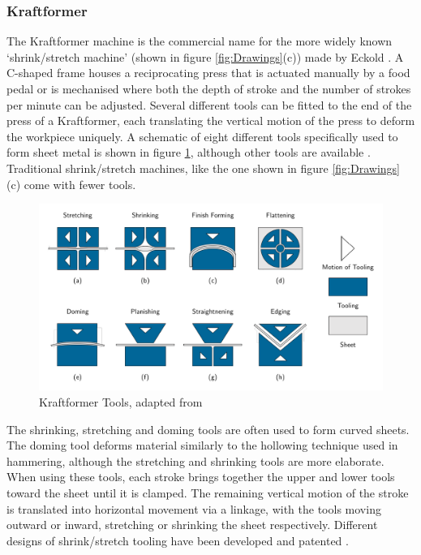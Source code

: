 \subsubsection{Kraftformer} \label{sec:ManualKraftformer}

The Kraftformer machine is the commercial name for the more widely known `shrink/stretch machine' (shown in figure \ref{fig:Drawings}(c)) made by Eckold \citep{Unknown2020ECKOLDBrochure}. A C-shaped frame houses a reciprocating press that is actuated manually by a food pedal or is mechanised where both the depth of stroke and the number of strokes per minute can be adjusted. Several different tools can be fitted to the end of the press of a Kraftformer, each translating the vertical motion of the press to deform the workpiece uniquely. A schematic of eight different tools specifically used to form sheet metal is shown in figure \ref{fig:Kraftformer}, although other tools are available \citep{Unknown2020ECKOLDBrochure}. Traditional shrink/stretch machines, like the one shown in figure \ref{fig:Drawings} (c) come with fewer tools.

\begin{figure}[h]
    \centering
    \includegraphics[width=0.7\linewidth]{Images/KraftformingTools4x2S.pdf}
    \caption{Kraftformer Tools, adapted from \citep{Unknown2020ECKOLDBrochure}}
    \label{fig:Kraftformer}
\end{figure}

The shrinking, stretching and doming tools are often used to form curved sheets. The doming tool deforms material similarly to the hollowing technique used in hammering, although the stretching and shrinking tools are more elaborate. When using these tools, each stroke brings together the upper and lower tools toward the sheet until it is clamped. The remaining vertical motion of the stroke is translated into horizontal movement via a linkage, with the tools moving outward or inward, stretching or shrinking the sheet respectively. Different designs of shrink/stretch tooling have been developed and patented \citep{Joyner1943SheetMachine,Rusch2011ShrinkerMachine,Eckold1950ToolElements,EckoldWalter1954ApparatusProfiles}.

